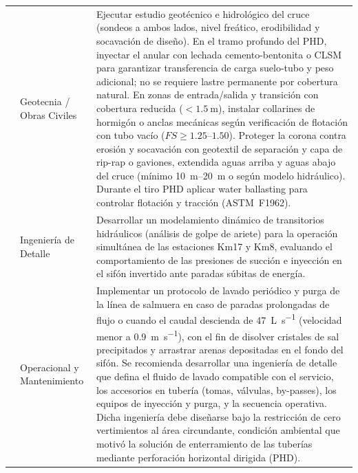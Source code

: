 \begin{longtable}{@{}N p{3.2cm} p{\dimexpr\textwidth-4.2cm-6\tabcolsep\relax}@{}}
    & Geotecnia / Obras Civiles & Ejecutar estudio geotécnico e hidrológico del cruce (sondeos a ambos lados, nivel freático, erodibilidad y socavación de diseño). En el tramo profundo del PHD, inyectar el anular con lechada cemento-bentonita o CLSM para garantizar transferencia de carga suelo-tubo y peso adicional; no se requiere lastre permanente por cobertura natural. En zonas de entrada/salida y transición con cobertura reducida ($<\SI{1.5}{\meter}$), instalar collarines de hormigón o anclas mecánicas según verificación de flotación con tubo vacío ($FS \geq 1.25$--$1.50$). Proteger la corona contra erosión y socavación con geotextil de separación y capa de rip-rap o gaviones, extendida aguas arriba y aguas abajo del cruce (mínimo \SI{10}{\meter}--\SI{20}{\meter} o según modelo hidráulico). Durante el tiro PHD aplicar water ballasting para controlar flotación y tracción (ASTM~F1962). \\
    & Ingeniería de Detalle & Desarrollar un modelamiento dinámico de transitorios hidráulicos (análisis de golpe de ariete) para la operación simultánea de las estaciones Km17 y Km8, evaluando el comportamiento de las presiones de succión e inyección en el sifón invertido ante paradas súbitas de energía. \\
    & Operacional y Mantenimiento & Implementar un protocolo de lavado periódico y purga de la línea de salmuera en caso de paradas prolongadas de flujo o cuando el caudal descienda de \SI{47}{\liter\per\second} (velocidad menor a \SI{0.9}{\meter\per\second}), con el fin de disolver cristales de sal precipitados y arrastrar arenas depositadas en el fondo del sifón. Se recomienda desarrollar una ingeniería de detalle que defina el fluido de lavado compatible con el servicio, los accesorios en tubería (tomas, válvulas, by-passes), los equipos de inyección y purga, y la secuencia operativa. Dicha ingeniería debe diseñarse bajo la restricción de cero vertimientos al área circundante, condición ambiental que motivó la solución de enterramiento de las tuberías mediante perforación horizontal dirigida (PHD). \\
\end{longtable}
